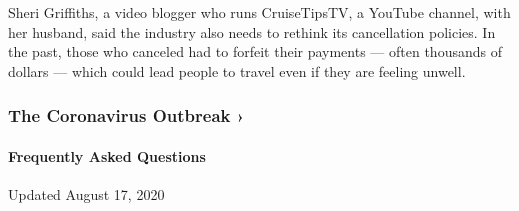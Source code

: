 Sheri Griffiths, a video blogger who runs CruiseTipsTV, a YouTube
channel, with her husband, said the industry also needs to rethink its
cancellation policies. In the past, those who canceled had to forfeit
their payments --- often thousands of dollars --- which could lead
people to travel even if they are feeling unwell.

\href{https://www.nytimes3xbfgragh.onion/news-event/coronavirus?action=click\&pgtype=Article\&state=default\&region=MAIN_CONTENT_3\&context=storylines_faq}{}

\hypertarget{the-coronavirus-outbreak-}{%
\subsubsection{The Coronavirus Outbreak
›}\label{the-coronavirus-outbreak-}}

\hypertarget{frequently-asked-questions}{%
\paragraph{Frequently Asked
Questions}\label{frequently-asked-questions}}

Updated August 17, 2020

